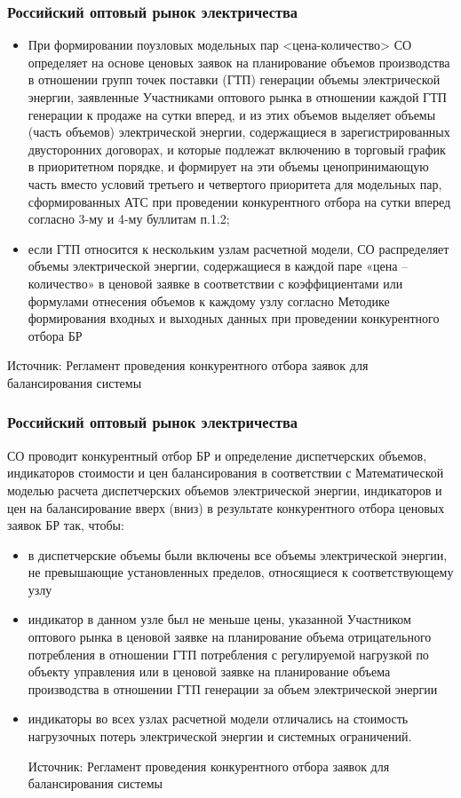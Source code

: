 \documentclass[c, dvipsnames]{beamer}  %
\begin{document}
\begin{frame}[shrink=5]
\frametitle{Российский оптовый рынок электричества} 


\begin{itemize}
	\item При формировании поузловых модельных пар <цена-количество> СО  определяет на основе ценовых заявок на планирование объемов производства в отношении групп точек поставки (ГТП) генерации объемы электрической энергии, заявленные Участниками оптового рынка в отношении каждой ГТП генерации к продаже на сутки вперед, и из этих объемов выделяет объемы (часть объемов) электрической энергии, содержащиеся в зарегистрированных двусторонних договорах, и которые подлежат включению в торговый график в приоритетном порядке, и формирует на эти объемы ценопринимающую часть вместо условий третьего и четвертого приоритета для модельных пар, сформированных АТС при проведении конкурентного отбора на сутки вперед согласно 3-му и 4-му буллитам п.1.2;
	\item если ГТП относится к нескольким узлам расчетной модели, СО распределяет объемы электрической энергии, содержащиеся в каждой паре «цена – количество» в ценовой заявке в соответствии с коэффициентами или формулами отнесения объемов к каждому узлу согласно Методике формирования входных и выходных данных при  проведении конкурентного отбора БР
\end{itemize}

Источник:
Регламент проведения конкурентного  отбора заявок для балансирования системы

\end{frame}



\begin{frame}[shrink=5]
\frametitle{Российский оптовый рынок электричества} 

СО проводит конкурентный отбор БР и определение диспетчерских объемов, индикаторов стоимости и цен балансирования в соответствии с Математической моделью расчета диспетчерских объемов электрической энергии, индикаторов и цен на балансирование вверх (вниз) в результате конкурентного отбора ценовых заявок БР так, чтобы:


\begin{itemize}
\item в диспетчерские объемы были включены все объемы электрической энергии, не превышающие установленных пределов, относящиеся к соответствующему узлу
\item индикатор в данном узле был не меньше цены, указанной Участником оптового рынка в ценовой заявке на планирование объема отрицательного потребления в отношении ГТП потребления с регулируемой нагрузкой по объекту управления или в ценовой заявке на планирование объема производства в отношении ГТП генерации за объем электрической энергии
\item индикаторы во всех узлах расчетной модели отличались на стоимость нагрузочных потерь электрической энергии и системных ограничений.

Источник:
Регламент проведения конкурентного  отбора заявок для балансирования системы


\end{itemize}
\end{frame}
\end{document}
